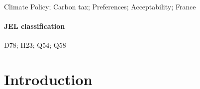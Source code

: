 \documentclass[english,5p,authoryear]{elsarticle}
\begin{document}
\begin{frontmatter}{}
%

%
%
%

%

%

%

%

%

%

%

%

%


%

%

%

%

%

%

%

%

%

%

%


\begin{keyword}
Climate Policy; Carbon tax; Preferences; Acceptability; France
\end{keyword}
%
\end{frontmatter}{}

%

%

%

%
%
%


%
%

%

\paragraph*{JEL classification} D78; H23; Q54; Q58

%

%
%
%
%

%
%
%
%
%



%
%

%

%
%
%

%
%

%


%

%

%

%

%
%


\setcounter{tocdepth}{2}
%
%

\vfill\eject 
%

\section{Introduction}
\end{document}
